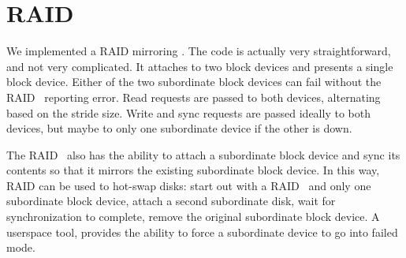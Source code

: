 \section{RAID}
\label{sec:raid}

We implemented a RAID mirroring \module. The code is actually very
straightforward, and not very complicated. It attaches to two block
devices and presents a single block device. Either of the two
subordinate block devices can fail without the RAID \module\ reporting
error. Read requests are passed to both devices, alternating based on
the stride size. Write and sync requests are passed ideally to both
devices, but maybe to only one subordinate device if the other is
down.

The RAID \module\ also has the ability to attach a subordinate block
device and sync its contents so that it mirrors the existing
subordinate block device. In this way, RAID can be used to hot-swap
disks: start out with a RAID \module\ and only one subordinate block
device, attach a second subordinate disk, wait for synchronization to
complete, remove the original subordinate block device. A userspace
tool, provides the ability to force a subordinate device to go into
failed mode.
